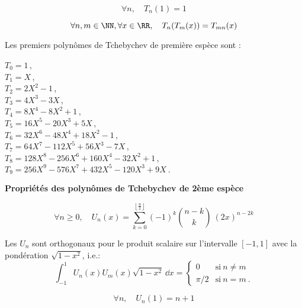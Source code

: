 \begin{equation}
\forall n, \quad
    T_n(1)=1
\end{equation}

\begin{equation}
\forall n,m\in\NN, \forall x\in\RR, \quad
    T_n(T_m(x))=T_{mn}(x)
\end{equation}

\medskip
{}
Les premiers polynômes de Tchebychev de première espèce sont :

\noindent
    $T_0 = 1 \,$,\\
    $T_1 = X \,$,\\
    $T_2 = 2X^2 - 1 \,$,\\
    $T_3 = 4X^3 - 3X \,$,\\
   $ T_4 = 8X^4 - 8X^2 + 1 \,$,\\
   $ T_5 = 16X^5 - 20X^3 + 5X \,$,\\
   $ T_6 = 32X^6 - 48X^4 + 18X^2 - 1 \,$,\\
   $ T_7 = 64X^7 - 112X^5 + 56X^3 - 7X \,$,\\
   $ T_8 = 128X^8 - 256X^6 + 160X^4 - 32X^2 + 1 \,$,\\
    $T_9 = 256X^9 - 576X^7 + 432X^5 - 120X^3 + 9X~.$ 

\medskip
\textbf{Propriétés des polynômes de Tchebychev de 2ème espèce}

\begin{equation}\forall n\ge 0, \quad
    U_n(x)=\sum_{k=0}^{\left\lfloor \frac n2\right \rfloor}(-1)^k \binom{n-k}k~(2x)^{n-2k}
\end{equation}

 Les $U_n$ sont orthogonaux pour le produit scalaire 
sur l'intervalle $[-1,1]$ avec la pondération $\sqrt{1-x^2}$, i.e.:
\begin{equation}
    \int_{-1}^1 U_n(x)U_m(x)\sqrt{1-x^2}\,\dd x = \begin{cases} 0&\text{si}~n\ne m\\ \pi/2 &\text{si}~n=m~. \end{cases} 
\end{equation}

\begin{equation}\forall n,\quad 
    U_n(1)=n+1
\end{equation}


